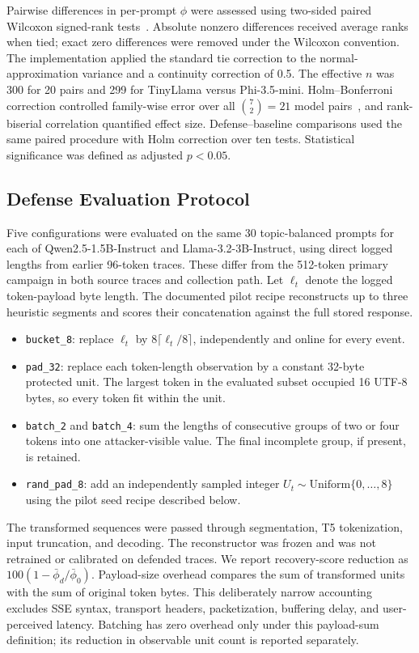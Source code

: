 \documentclass[electronics,article,submit,pdftex,moreauthors]{Definitions/mdpi}
\begin{document}
Pairwise differences in per-prompt $\phi$ were assessed using two-sided paired Wilcoxon signed-rank tests~\cite{wilcoxon1945individual}. Absolute nonzero differences received average ranks when tied; exact zero differences were removed under the Wilcoxon convention. The implementation applied the standard tie correction to the normal-approximation variance and a continuity correction of 0.5. The effective $n$ was 300 for 20 pairs and 299 for TinyLlama versus Phi-3.5-mini. Holm--Bonferroni correction controlled family-wise error over all $\binom{7}{2}=21$ model pairs~\cite{holm1979simple}, and rank-biserial correlation quantified effect size. Defense--baseline comparisons used the same paired procedure with Holm correction over ten tests. Statistical significance was defined as adjusted $p<0.05$.

\subsection{Defense Evaluation Protocol}
Five configurations were evaluated on the same 30 topic-balanced prompts for each of Qwen2.5-1.5B-Instruct and Llama-3.2-3B-Instruct, using direct logged lengths from earlier 96-token traces. These differ from the 512-token primary campaign in both source traces and collection path. Let $\ell_t$ denote the logged token-payload byte length. The documented pilot recipe reconstructs up to three heuristic segments and scores their concatenation against the full stored response.
\begin{itemize}[leftmargin=2em]
    \item \texttt{bucket\_8}: replace $\ell_t$ by $8\lceil \ell_t/8\rceil$, independently and online for every event.
    \item \texttt{pad\_32}: replace each token-length observation by a constant 32-byte protected unit. The largest token in the evaluated subset occupied 16 UTF-8 bytes, so every token fit within the unit.
    \item \texttt{batch\_2} and \texttt{batch\_4}: sum the lengths of consecutive groups of two or four tokens into one attacker-visible value. The final incomplete group, if present, is retained.
    \item \texttt{rand\_pad\_8}: add an independently sampled integer $U_t\sim\mathrm{Uniform}\{0,\ldots,8\}$ using the pilot seed recipe described below.
\end{itemize}
The transformed sequences were passed through segmentation, T5 tokenization, input truncation, and decoding. The reconstructor was frozen and was not retrained or calibrated on defended traces. We report recovery-score reduction as $100(1-\bar\phi_d/\bar\phi_0)$. Payload-size overhead compares the sum of transformed units with the sum of original token bytes. This deliberately narrow accounting excludes SSE syntax, transport headers, packetization, buffering delay, and user-perceived latency. Batching has zero overhead only under this payload-sum definition; its reduction in observable unit count is reported separately.
\end{document}
